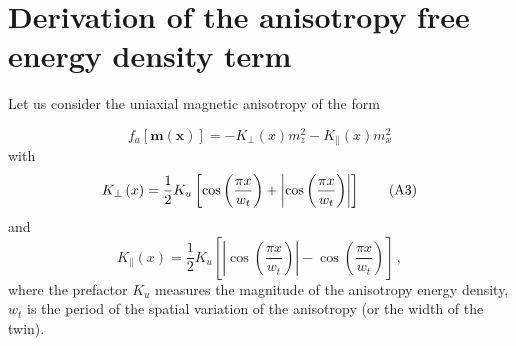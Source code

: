 \documentclass[10pt,onecolumn,prb,aps,notitlepage]{revtex4}
\begin{document}
\section{Derivation of the anisotropy free energy density term}

Let us consider the uniaxial magnetic anisotropy of the form

\begin{equation}
f_{a}\left[ \mathbf{m}\left( \mathbf{x}\right) \right] =-K_{\perp }\left(
x\right) m_{z}^{2}-K_{\parallel }\left( x\right) m_{x}^{2}  \tag{A2}
\end{equation}%
with
\begin{equation}
K_{\perp }\left( x\right) =\frac{1}{2}K_{u}\left[ \cos \left( \frac{\pi x}{%
w_{t}}\right) +\left\vert \cos \left( \frac{\pi x}{w_{t}}\right) \right\vert %
\right]  \tag{A3}
\end{equation}%
and
\begin{equation}
K_{\parallel }\left( x\right) =\frac{1}{2}K_{u}\left[ \left\vert \cos \left(
\frac{\pi x}{w_{t}}\right) \right\vert -\cos \left( \frac{\pi x}{w_{t}}%
\right) \right]\,,  \tag{A4}
\end{equation}%
where the prefactor $K_{u}$ measures the magnitude of the anisotropy energy
density, $w_{t}$ is the period of the spatial variation of the anisotropy
(or the width of the twin).
\end{document}
